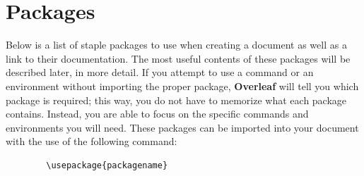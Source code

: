 \documentclass[]{article}
\newcommand{\dent}{\hspace{\parindent}} %
\begin{document}
    \section{Packages}
    \dent Below is a list of staple packages to use when creating a document as well as a link to their documentation. The most useful contents of these packages will be described later, in more detail. If you attempt to use a command or an environment without importing the proper package, \textbf{Overleaf} will tell you which package is required; this way, you do not have to memorize what each package contains. Instead, you are able to focus on the specific commands and environments you will need. These packages can be imported into your document with the use of the following command:
    \begin{verbatim}
        \usepackage{packagename}
    \end{verbatim}
\end{document}
